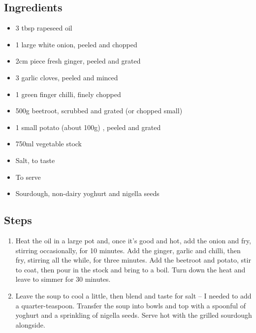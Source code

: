 \documentclass{book}
\begin{document}
\subsection*{Ingredients}
\begin{itemize}
\item 3 tbsp rapeseed oil 
\item 1 large white onion, peeled and chopped
\item 2cm piece fresh ginger, peeled and grated 
\item 3 garlic cloves, peeled and minced 
\item 1 green finger chilli, finely chopped 
\item 500g beetroot, scrubbed and grated (or chopped small)
\item 1 small potato (about 100g) , peeled and grated 
\item 750ml vegetable stock 
\item Salt, to taste
\end{itemize}

\begin{itemize}
\item To serve
\item Sourdough, non-dairy yoghurt and nigella seeds
\end{itemize}

\subsection*{Steps}
\begin{enumerate}
\item Heat the oil in a large pot and, once it’s good and hot, add the onion and fry, stirring occasionally, for 10 minutes. Add the ginger, garlic and chilli, then fry, stirring all the while, for three minutes. Add the beetroot and potato, stir to coat, then pour in the stock and bring to a boil. Turn down the heat and leave to simmer for 30 minutes.
\item Leave the soup to cool a little, then blend and taste for salt – I needed to add a quarter-teaspoon. Transfer the soup into bowls and top with a spoonful of yoghurt and a sprinkling of nigella seeds. Serve hot with the grilled sourdough alongside.
\end{enumerate}
\newpage
\end{document}
